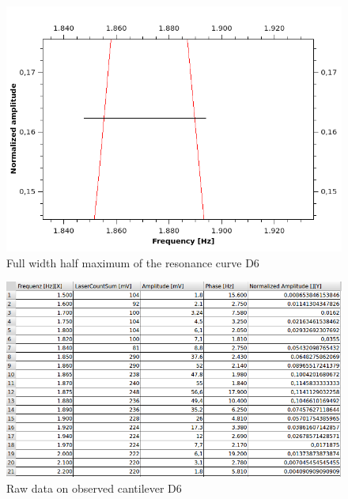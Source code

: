 \documentclass[12pt,a4paper]{article}
\begin{document}
\begin{multicols}{2}
\begin{figure}[H]
	\centering
	\includegraphics[scale=0.4]{../figures/ResonanzkurveHalbwertsbreite.png}
	\caption{Full width half maximum of the resonance curve D6}
	\label{fig:resonanzkurvehmfuw}
\end{figure}

\end{multicols}
\begin{figure}[H]
	\centering
	\includegraphics[scale=0.5]{../figures/rohdaten.png}
	\caption{Raw data on observed cantilever D6}
	\label{fig:resonanzkurvedata}
\end{figure}
\end{document}
